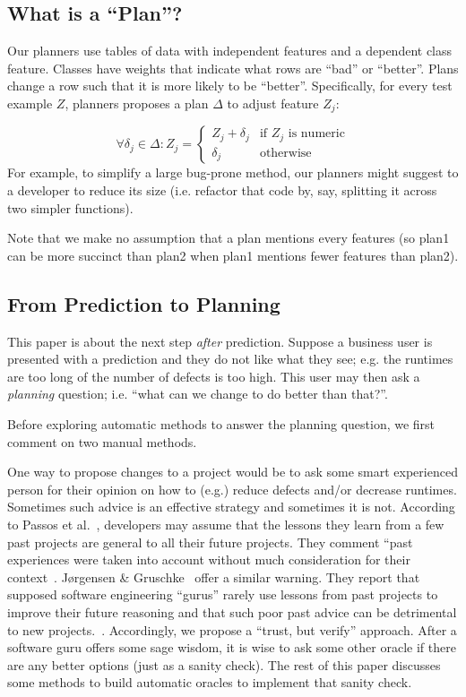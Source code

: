 \documentclass{sig-alternate}
\begin{document}
\subsection{What is a ``Plan''?}

Our planners   use tables of data with independent features and a dependent class
feature. Classes have weights  that  indicate  what rows are ``bad'' or ``better''. Plans  change   a row such that it is more likely to be ``better''. 
Specifically, for every test example $Z$,   planners proposes a  plan $\Delta$ to
  adjust   feature $Z_j$:

{\small\[
\forall \delta_j \in \Delta :  Z_j =  
\begin{cases}
     Z_j + \delta_j& \text{if $Z_j$ is numeric}\\
    \delta_j              & \text{otherwise}
\end{cases}
\]}
For example, to simplify a  large bug-prone  method, our planners might suggest
to a developer to reduce its size (i.e.  refactor that code by, say, splitting it across
two simpler functions).

Note that we make no assumption that a plan mentions every features
(so plan1 can be  more succinct than plan2 when plan1  mentions fewer features than
plan2).


\subsection{From Prediction to Planning}
 
 
This paper is about the next step {\em after} prediction. Suppose
a business user is presented with  a prediction and they do not like what they see; e.g. the runtimes are too long of the number of defects is too high. This user may
then ask a {\em planning}  question; i.e. ``what can we change to do better than that?''.

 

Before exploring automatic methods to answer the planning question, we first comment
on two manual methods.

One way to propose changes to a project would be to   ask some smart experienced
person for their opinion on how to (e.g.) reduce defects and/or decrease runtimes. Sometimes
such advice 
is an effective strategy and sometimes it is not.
According to Passos et al.~\cite{passos11},  developers
may  assume that the lessons they learn from a few past
projects are general to 
all their future projects. They comment ``past experiences were taken into account without 
much consideration for their context~\cite{passos11}.  
 J{\o}rgensen \& Gruschke~\cite{jorgensen09} offer  a similar warning. They report that 
  supposed software engineering    ``gurus'' rarely use lessons
  from past projects to improve their future reasoning and that such poor
  past advice can be detrimental to new projects.~\cite{jorgensen09}.
  Accordingly, we   propose a ``trust, but verify'' approach.
  After a software guru offers some sage wisdom,  it is wise to ask some other oracle 
  if there are any better options
  (just as a sanity check).
  The rest of this paper discusses some methods to build automatic oracles 
  to implement that   sanity check.
  
\end{document}

